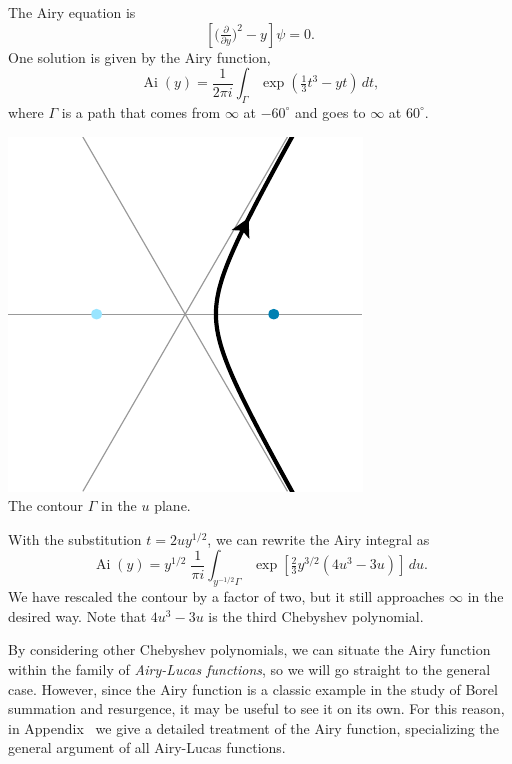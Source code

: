 \documentclass{article}
\DeclareMathOperator{\Ai}{Ai}
\begin{document}
The Airy equation is
\begin{equation}\label{eqn:airy}
\left[\big(\tfrac{\partial}{\partial y}\big)^2 - y\right] \psi = 0.
\end{equation}
One solution is given by the Airy function,
\[ \Ai(y) = \frac{1}{2\pi i} \int_{\Gamma} \exp\left(\tfrac{1}{3}t^3 - yt\right)\,dt, \]
where $\Gamma$ is a path that comes from $\infty$ at $-60^\circ$ and goes to $\infty$ at $60^\circ$.
\begin{center}
\includegraphics{figures/u_contour_3.pdf} \\[1em]
{\small The contour $\Gamma$ in the $u$ plane.}
\end{center}
With the substitution $t = 2uy^{1/2}$, we can rewrite the Airy integral as
\[ \Ai(y) = y^{1/2}\;\frac{1}{\pi i} \int_{y^{-1/2} \Gamma} \exp\left[\tfrac{2}{3}y^{3/2} \left(4u^3 - 3u\right)\right]\,du. \]
We have rescaled the contour by a factor of two, but it still approaches $\infty$ in the desired way. Note that $4u^3 - 3u$ is the third Chebyshev polynomial.

By considering other Chebyshev polynomials, we can situate the Airy function within the family of {\em Airy-Lucas functions}, so we will go straight to the general case. However, since the Airy function is a classic example in the study of Borel summation and resurgence, it may be useful to see it on its own. For this reason, in Appendix~\cite{airy-appendix} we give a detailed treatment of the Airy function, specializing the general argument of all Airy-Lucas functions. 
\end{document}
